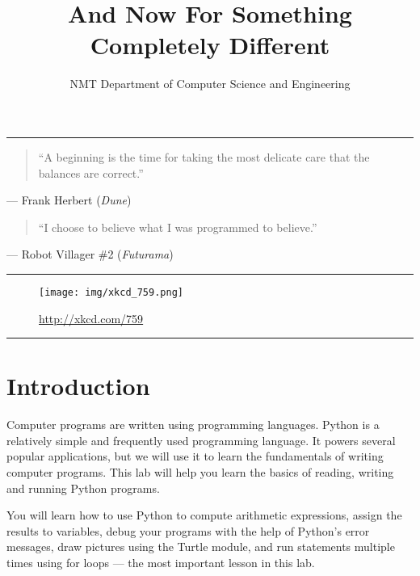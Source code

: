 \documentclass[11pt]{cselabheader}
\title{{\large And Now For Something Completely Different} \\ \thetitle}
\author{\theauthor}
\date{NMT Department of Computer Science and Engineering}
\begin{document}

\maketitle
\hrule

\begin{quotation}
  ``A beginning is the time for taking the most delicate care that the
  balances are correct.''
\end{quotation}

\begin{flushright}
    --- Frank Herbert (\textit{Dune})
\end{flushright}

\begin{quotation}
  ``I choose to believe what I was programmed to believe.''
  \end{quotation}

\begin{flushright}
    --- Robot Villager \#2 (\textit{Futurama})
  \end{flushright}

\vspace{1em}

\hrule

\begin{figure}[H]
  \centering
  \texttt{[image: img/xkcd\_759.png]}
  \caption{\url{http://xkcd.com/759}}
\end{figure}

\hrule

\section*{Introduction}
Computer programs are written using programming languages. Python is a
relatively simple and frequently used programming language. It powers
several popular applications, but we will use it to learn the
fundamentals of writing computer programs.  This lab will help you
learn the basics of reading, writing and running Python programs.

You will learn how to use Python to compute arithmetic expressions,
assign the results to variables, debug your programs with the
help of Python's error messages, draw pictures using the Turtle
module, and run statements multiple times using for loops --- the most
important lesson in this lab.

\tableofcontents

\newpage
{}
\end{document}

